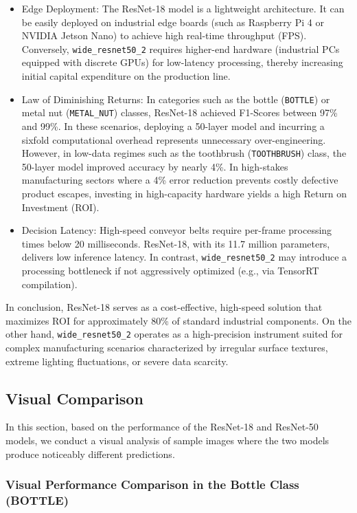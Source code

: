 \documentclass{article}
\begin{document}
\begin{itemize}
	\item Edge Deployment:
	The ResNet-18 model is a lightweight architecture. It can be easily deployed on industrial edge boards (such as Raspberry Pi 4 or NVIDIA Jetson Nano) to achieve high real-time throughput (FPS). Conversely, \texttt{wide\_resnet50\_2} requires higher-end hardware (industrial PCs equipped with discrete GPUs) for low-latency processing, thereby increasing initial capital expenditure on the production line.
	
	\item Law of Diminishing Returns:
	In categories such as the bottle (\texttt{BOTTLE}) or metal nut (\texttt{METAL\_NUT}) classes, ResNet-18 achieved F1-Scores between 97\% and 99\%. In these scenarios, deploying a 50-layer model and incurring a sixfold computational overhead represents unnecessary over-engineering. However, in low-data regimes such as the toothbrush (\texttt{TOOTHBRUSH}) class, the 50-layer model improved accuracy by nearly 4\%. In high-stakes manufacturing sectors where a 4\% error reduction prevents costly defective product escapes, investing in high-capacity hardware yields a high Return on Investment (ROI).
	
	\item Decision Latency:
	High-speed conveyor belts require per-frame processing times below 20 milliseconds. ResNet-18, with its 11.7 million parameters, delivers low inference latency. In contrast, \texttt{wide\_resnet50\_2} may introduce a processing bottleneck if not aggressively optimized (e.g., via TensorRT compilation).
\end{itemize}

In conclusion, ResNet-18 serves as a cost-effective, high-speed solution that maximizes ROI for approximately 80\% of standard industrial components. On the other hand, \texttt{wide\_resnet50\_2} operates as a high-precision instrument suited for complex manufacturing scenarios characterized by irregular surface textures, extreme lighting fluctuations, or severe data scarcity.


\subsection{Visual Comparison}
In this section, based on the performance of the ResNet-18 and ResNet-50 models, we conduct a visual analysis of sample images where the two models produce noticeably different predictions.

\subsubsection{Visual Performance Comparison in the Bottle Class (BOTTLE)}
\end{document}
